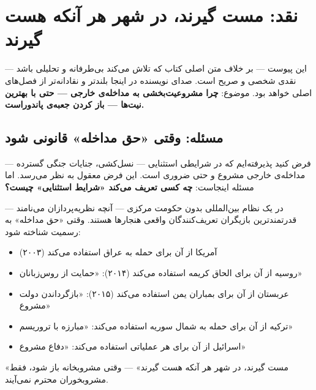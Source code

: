 \chapter{نقد: مست گیرند، در شهر هر آنکه هست گیرند}
\label{app:critical-essay}

\begin{tcolorbox}[mybox, title={درباره‌ی این پیوست}]
این پیوست — بر خلاف متن اصلی کتاب که تلاش می‌کند بی‌طرفانه و تحلیلی باشد — نقدی شخصی و صریح است. صدای نویسنده در اینجا بلندتر و نقادانه‌تر از فصل‌های اصلی خواهد بود. موضوع: \textbf{چرا مشروعیت‌بخشی به مداخله‌ی خارجی — حتی با بهترین نیت‌ها — باز کردن جعبه‌ی پاندوراست.}
\end{tcolorbox}

\section{مسئله: وقتی «حق مداخله» قانونی شود}
\label{sec:app-b-problem}

فرض کنید پذیرفته‌ایم که در شرایطی استثنایی — نسل‌کشی، جنایات جنگی گسترده — مداخله‌ی خارجی مشروع و حتی ضروری است. این فرض معقول به نظر می‌رسد. اما مسئله اینجاست: \textbf{چه کسی تعریف می‌کند «شرایط استثنایی» چیست؟}

در یک نظام بین‌المللی بدون حکومت مرکزی — آنچه نظریه‌پردازان  می‌نامند — قدرتمندترین بازیگران تعریف‌کنندگان واقعی هنجارها هستند. وقتی «حق مداخله» به رسمیت شناخته شود:

\begin{itemize}
\item آمریکا از آن برای حمله به عراق استفاده می‌کند (۲۰۰۳)
\item روسیه از آن برای الحاق کریمه استفاده می‌کند (۲۰۱۴): «حمایت از روس‌زبانان»
\item عربستان از آن برای بمباران یمن استفاده می‌کند (۲۰۱۵): «بازگرداندن دولت مشروع»
\item ترکیه از آن برای حمله به شمال سوریه استفاده می‌کند: «مبارزه با تروریسم»
\item اسرائیل از آن برای هر عملیاتی استفاده می‌کند: «دفاع مشروع»
\end{itemize}

«مست گیرند، در شهر هر آنکه هست گیرند» — وقتی مشروبخانه باز شود، فقط مشروبخوران محترم نمی‌آیند.

